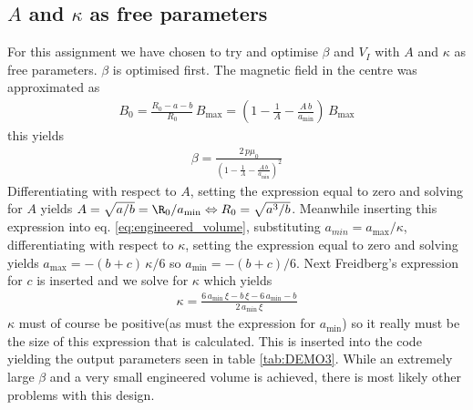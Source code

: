 \subsection{$A$ and $\kappa$ as free parameters}

For this assignment we have chosen to try and optimise $\beta$ and $V_{\si{I}}$ with $A$ and $\kappa$ as free parameters. $\beta$ is optimised first. The magnetic field in the centre was approximated as
\begin{align}
    B_{0}=\frac{R_{0}-a-b}{R_{0}}\,B_{\max}=(1-\frac{1}{A}-\frac{A\, b}{a_{\min}})\, B_{\max}
\end{align}
this yields 
\begin{align}
    \beta=\frac{2\, p\mu_{0}}{(1-\frac{1}{A}-\frac{A\, b}{a_{\min}})^{2}}
\end{align}
Differentiating with respect to $A$, setting the expression equal to zero and solving for $A$ yields $A=\sqrt{a/b}=\R_{0}/a_{\min}\Leftrightarrow R_{0}=\sqrt{a^{3}/b}$. Meanwhile inserting this expression into eq. 
\ref{eq:engineered_volume}, substituting $a_{min}=a_{\max}/\kappa$,
differentiating with respect to $\kappa$, setting the expression equal to zero and solving yields $a_{\max}=-(b+c)\,\kappa/6$ so $a_{\min}=-(b+c)/6$. Next Freidberg's expression for $c$ is inserted and we solve for $\kappa$ which yields
\begin{align}
    \kappa=\frac{6\, a_{\min}\,\xi-b\,\xi-6\, a_{\min}-b}{2\,a_{\min}\,\xi}
\end{align}
$\kappa$ must of course be positive(as must the expression for $a_{\min}$) so it really must be the size of this expression that is calculated. This is inserted into the code yielding the output parameters seen in table \ref{tab:DEMO3}. While an extremely large $\beta$ and a very small engineered volume is achieved, there is most likely other problems with this design.
